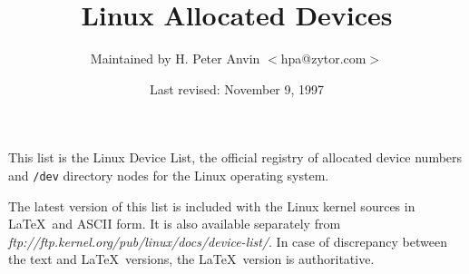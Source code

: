 %
%
%
\oddsidemargin=0in
\textwidth=6.5in
\topmargin=0in
\headheight=0.5in
\headsep=0.25in
\textheight=7.5in
\footskip=0.75in
\footheight=0.5in
%

\newcommand{\file}{\tt}			%
\newcommand{\url}{\it}		        %
\newcommand{\hex}{\tt}			%
\newcommand{\ud}{(Under development)}	%
\newcommand{\1}{\({}^1\)}
\newcommand{\2}{\({}^2\)}
\newcommand{\3}{\({}^3\)}
\newcommand{\4}{\({}^4\)}
\newlength{\dig}
\settowidth{\dig}{0}			%
\newcommand{\num}[2]{\makebox[#1\dig][r]{#2}}
\newcommand{\major}[4]{\num{3}{#1}#2 \> #3 \> #4 \\}
\newcommand{\minor}[3]{\> \> \num{3}{#1} \> {\file #2} \> #3 \\}
\newcommand{\minordots}{\> \> \> \dots \\}
\newenvironment{devicelist}%
 {\begin{tabbing}%
000--000 \= blockxxx \= 000 \= {\file /dev/crambamboli} \= foo \kill}%
 {\end{tabbing}}
\newcommand{\link}[4]{{\file #1} \> {\file #2} \> #3 \> #4 \\}
\newcommand{\vlink}[4]{{\file #1} \> {\em #2 \/} \> #3 \> #4 \\}
\newcommand{\node}[3]{{\file #1} \> #2 \> #3 \\}
\newcommand{\tum}{$''$}
\newenvironment{nodelist}%
 {\begin{tabbing}%
{\file /dev/crambamboli} \= {\file /proc/self/fd/99} \= symbolicxxx \=
foo \kill}%
 {\end{tabbing}}
%
%
\title{{\bf Linux Allocated Devices}}
\author{Maintained by H. Peter Anvin $<$hpa@zytor.com$>$}
\date{Last revised: November 9, 1997}
\maketitle
%
\noindent
This list is the Linux Device List, the official registry of allocated
device numbers and {\file /dev} directory nodes for the Linux
operating system.

The latest version of this list is included with the Linux kernel
sources in \LaTeX\ and ASCII form.  It is also available separately
from {\url ftp://ftp.kernel.org/pub/linux/docs/device-list/}.  In case
of discrepancy between the text and \LaTeX\ versions, the \LaTeX\
version is authoritative.

